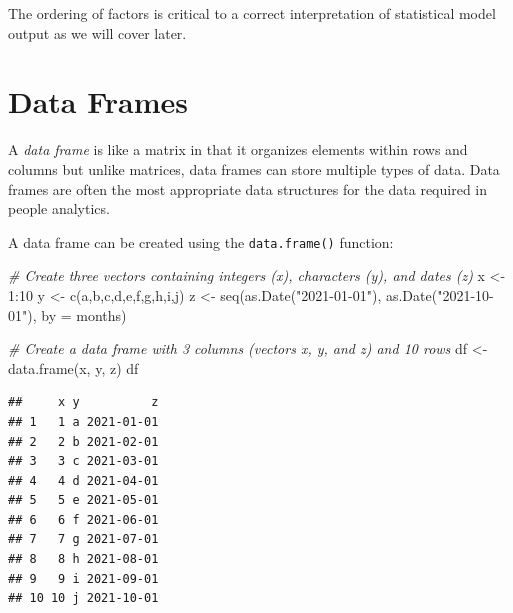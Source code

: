 \documentclass[
]{book}
\newenvironment{Shaded}{\begin{snugshade}}{\end{snugshade}}
\newcommand{\AttributeTok}[1]{\textcolor[rgb]{0.77,0.63,0.00}{#1}}
\newcommand{\CommentTok}[1]{\textcolor[rgb]{0.56,0.35,0.01}{\textit{#1}}}
\newcommand{\DecValTok}[1]{\textcolor[rgb]{0.00,0.00,0.81}{#1}}
\newcommand{\FunctionTok}[1]{\textcolor[rgb]{0.00,0.00,0.00}{#1}}
\newcommand{\NormalTok}[1]{#1}
\newcommand{\OtherTok}[1]{\textcolor[rgb]{0.56,0.35,0.01}{#1}}
\newcommand{\SpecialCharTok}[1]{\textcolor[rgb]{0.00,0.00,0.00}{#1}}
\newcommand{\StringTok}[1]{\textcolor[rgb]{0.31,0.60,0.02}{#1}}
\begin{document}
The ordering of factors is critical to a correct interpretation of statistical model output as we will cover later.

\hypertarget{data-frames}{%
\section{Data Frames}\label{data-frames}}

A \emph{data frame} is like a matrix in that it organizes elements within rows and columns but unlike matrices, data frames can store multiple types of data. Data frames are often the most appropriate data structures for the data required in people analytics.

A data frame can be created using the \texttt{data.frame()} function:

\begin{Shaded}
\begin{Highlighting}[]
\CommentTok{\# Create three vectors containing integers (x), characters (y), and dates (z)}
\NormalTok{x }\OtherTok{\textless{}{-}} \DecValTok{1}\SpecialCharTok{:}\DecValTok{10}
\NormalTok{y }\OtherTok{\textless{}{-}} \FunctionTok{c}\NormalTok{(}\StringTok{\textquotesingle{}a\textquotesingle{}}\NormalTok{,}\StringTok{\textquotesingle{}b\textquotesingle{}}\NormalTok{,}\StringTok{\textquotesingle{}c\textquotesingle{}}\NormalTok{,}\StringTok{\textquotesingle{}d\textquotesingle{}}\NormalTok{,}\StringTok{\textquotesingle{}e\textquotesingle{}}\NormalTok{,}\StringTok{\textquotesingle{}f\textquotesingle{}}\NormalTok{,}\StringTok{\textquotesingle{}g\textquotesingle{}}\NormalTok{,}\StringTok{\textquotesingle{}h\textquotesingle{}}\NormalTok{,}\StringTok{\textquotesingle{}i\textquotesingle{}}\NormalTok{,}\StringTok{\textquotesingle{}j\textquotesingle{}}\NormalTok{)}
\NormalTok{z }\OtherTok{\textless{}{-}} \FunctionTok{seq}\NormalTok{(}\FunctionTok{as.Date}\NormalTok{(}\StringTok{"2021{-}01{-}01"}\NormalTok{), }\FunctionTok{as.Date}\NormalTok{(}\StringTok{"2021{-}10{-}01"}\NormalTok{), }\AttributeTok{by =} \StringTok{\textquotesingle{}months\textquotesingle{}}\NormalTok{)}

\CommentTok{\# Create a data frame with 3 columns (vectors x, y, and z) and 10 rows}
\NormalTok{df }\OtherTok{\textless{}{-}} \FunctionTok{data.frame}\NormalTok{(x, y, z)}
\NormalTok{df}
\end{Highlighting}
\end{Shaded}

\begin{verbatim}
##     x y          z
## 1   1 a 2021-01-01
## 2   2 b 2021-02-01
## 3   3 c 2021-03-01
## 4   4 d 2021-04-01
## 5   5 e 2021-05-01
## 6   6 f 2021-06-01
## 7   7 g 2021-07-01
## 8   8 h 2021-08-01
## 9   9 i 2021-09-01
## 10 10 j 2021-10-01
\end{verbatim}
\end{document}
